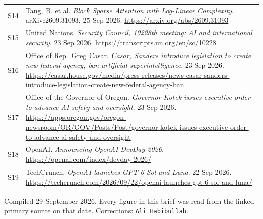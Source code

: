 \documentclass[11pt,a4paper]{article}
\newcommand{\briefdate}{29 September 2026}
\newcommand{\briefauthor}{Ali Habibullah}
\begin{document}
{\begin{tabularx}{\textwidth}{@{}l X@{}}
S14 & Tang, B. et al. \emph{Block Sparse Attention with Log-Linear Complexity}. arXiv:2609.31093, 25 Sep 2026. \url{https://arxiv.org/abs/2609.31093} \\
S15 & United Nations. \emph{Security Council, 10228th meeting: AI and international security}. 23 Sep 2026. \url{https://transcripts.un.org/en/sc/10228} \\
S16 & Office of Rep.\ Greg Casar. \emph{Casar, Sanders introduce legislation to create new federal agency, ban artificial superintelligence}. 23 Sep 2026. \url{https://casar.house.gov/media/press-releases/news-casar-sanders-introduce-legislation-create-new-federal-agency-ban} \\
S17 & Office of the Governor of Oregon. \emph{Governor Kotek issues executive order to advance AI safety and oversight}. 23 Sep 2026. \url{https://apps.oregon.gov/oregon-newsroom/OR/GOV/Posts/Post/governor-kotek-issues-executive-order-to-advance-ai-safety-and-oversight} \\
S18 & OpenAI. \emph{Announcing OpenAI DevDay 2026}. \url{https://openai.com/index/devday-2026/} \\
S19 & TechCrunch. \emph{OpenAI launches GPT-6 Sol and Luna}. 22 Sep 2026. \url{https://techcrunch.com/2026/09/22/openai-launches-gpt-6-sol-and-luna/} \\
\bottomrule
\end{tabularx}}

\vspace{0.8em}
{\footnotesize\color{brandgrey}
Compiled \briefdate. Every figure in this brief was read from the linked primary
source on that date. Corrections: \texttt{\briefauthor}.}
\end{document}
